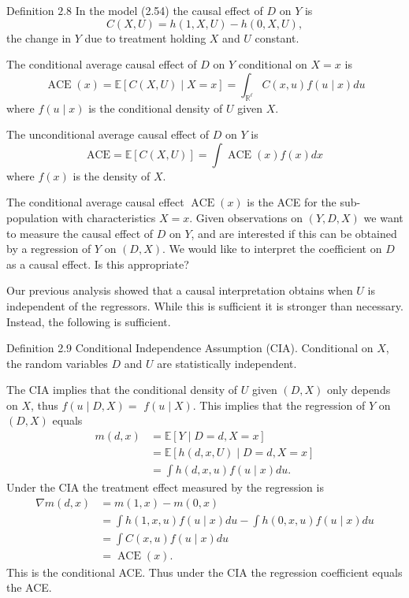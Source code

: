 \documentclass[10pt]{article}
\begin{document}
Definition $2.8$ In the model (2.54) the causal effect of $D$ on $Y$ is
$$
C(X, U)=h(1, X, U)-h(0, X, U),
$$
the change in $Y$ due to treatment holding $X$ and $U$ constant.

The conditional average causal effect of $D$ on $Y$ conditional on $X=x$ is
$$
\operatorname{ACE}(x)=\mathbb{E}[C(X, U) \mid X=x]=\int_{\mathbb{R}^{\ell}} C(x, u) f(u \mid x) d u
$$
where $f(u \mid x)$ is the conditional density of $U$ given $X$.

The unconditional average causal effect of $D$ on $Y$ is
$$
\mathrm{ACE}=\mathbb{E}[C(X, U)]=\int \operatorname{ACE}(x) f(x) d x
$$
where $f(x)$ is the density of $X$.

The conditional average causal effect $\operatorname{ACE}(x)$ is the ACE for the sub-population with characteristics $X=x$. Given observations on $(Y, D, X)$ we want to measure the causal effect of $D$ on $Y$, and are interested if this can be obtained by a regression of $Y$ on $(D, X)$. We would like to interpret the coefficient on $D$ as a causal effect. Is this appropriate?

Our previous analysis showed that a causal interpretation obtains when $U$ is independent of the regressors. While this is sufficient it is stronger than necessary. Instead, the following is sufficient.

Definition 2.9 Conditional Independence Assumption (CIA). Conditional on $X$, the random variables $D$ and $U$ are statistically independent.

The CIA implies that the conditional density of $U$ given $(D, X)$ only depends on $X$, thus $f(u \mid D, X)=$ $f(u \mid X)$. This implies that the regression of $Y$ on $(D, X)$ equals
$$
\begin{aligned}
m(d, x) &=\mathbb{E}[Y \mid D=d, X=x] \\
&=\mathbb{E}[h(d, x, U) \mid D=d, X=x] \\
&=\int h(d, x, u) f(u \mid x) d u .
\end{aligned}
$$
Under the CIA the treatment effect measured by the regression is
$$
\begin{aligned}
\nabla m(d, x) &=m(1, x)-m(0, x) \\
&=\int h(1, x, u) f(u \mid x) d u-\int h(0, x, u) f(u \mid x) d u \\
&=\int C(x, u) f(u \mid x) d u \\
&=\operatorname{ACE}(x) .
\end{aligned}
$$
This is the conditional ACE. Thus under the CIA the regression coefficient equals the ACE.
\end{document}
